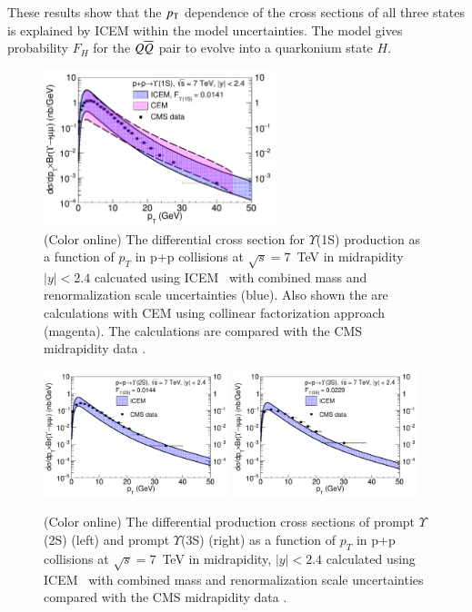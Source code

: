 These results show that the $p_{\rm T}$ dependence of the cross sections of all three states
is explained by ICEM within the model uncertainties. The model gives 
probability $F_H$ for the $Q \overline{Q}$ pair to evolve into a 
quarkonium state $H$.
  
\begin{figure}
\centering
\includegraphics[width=0.60\textwidth]{Figures/Fig1_RV1S.pdf}
\caption{(Color online) The differential cross section for $\varUpsilon$(1S) production as a function
  of $p_T$ in p+p collisions at $\sqrt{s} = 7$~TeV in midrapidity $|y|<2.4$ calcuated using
ICEM~\cite{Cheung:2018upe} with combined mass and renormalization scale
uncertainties (blue).  Also shown the are calculations with CEM using collinear
factorization approach (magenta).
 The calculations are compared with the CMS midrapidity data \cite{CMS:2013qur}.}
\label{CMS_1S_pt}
\end{figure}



\begin{figure}
\centering
\includegraphics[width=0.48\textwidth]{Figures/Fig2l_RV2S.pdf}
\includegraphics[width=0.48\textwidth]{Figures/Fig2r_RV3S.pdf}
\caption{(Color online) The differential production cross sections of prompt $\varUpsilon$(2S) (left)
  and prompt $\varUpsilon$(3S) (right) as a function
  of $p_T$ in p+p collisions at $\sqrt{s} = 7$~TeV in midrapidity, $|y|<2.4$
  calculated using ICEM~\cite{Cheung:2018upe} with combined mass and renormalization
  scale uncertainties compared with the CMS midrapidity data \cite{CMS:2013qur}.}
\label{CMS_2S_3S_pt}
\end{figure}








